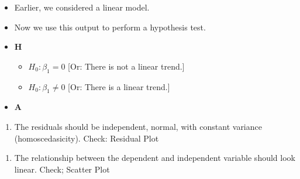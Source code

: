 \documentclass[]{article}
\newenvironment{Shaded}{\begin{snugshade}}{\end{snugshade}}
\newcommand{\DataTypeTok}[1]{\textcolor[rgb]{0.13,0.29,0.53}{#1}}
\newcommand{\DecValTok}[1]{\textcolor[rgb]{0.00,0.00,0.81}{#1}}
\newcommand{\KeywordTok}[1]{\textcolor[rgb]{0.13,0.29,0.53}{\textbf{#1}}}
\newcommand{\NormalTok}[1]{#1}
\newcommand{\OperatorTok}[1]{\textcolor[rgb]{0.81,0.36,0.00}{\textbf{#1}}}
\newcommand{\StringTok}[1]{\textcolor[rgb]{0.31,0.60,0.02}{#1}}
\providecommand{\tightlist}{%
  \setlength{\itemsep}{0pt}\setlength{\parskip}{0pt}}
\begin{document}
\begin{itemize}
\tightlist
\item
  Earlier, we considered a linear model.
\end{itemize}

\begin{Shaded}
\end{Shaded}

\begin{itemize}
\item
  Now we use this output to perform a hypothesis test.
\item
  \textbf{H}

  \begin{itemize}
  \tightlist
  \item
    \(H_0: \beta_1=0\) {[}Or: There is not a linear trend.{]}
  \item
    \(H_0: \beta_1 \neq 0\) {[}Or: There is a linear trend.{]}
  \end{itemize}
\item
  \textbf{A}
\end{itemize}

\begin{enumerate}
\def\labelenumi{(\arabic{enumi})}
\tightlist
\item
  The residuals should be independent, normal, with constant variance (homoscedasicity). Check: Residual Plot
\end{enumerate}

\begin{Shaded}
\end{Shaded}

\begin{enumerate}
\def\labelenumi{(\arabic{enumi})}
\setcounter{enumi}{1}
\tightlist
\item
  The relationship between the dependent and independent variable should look linear. Check; Scatter Plot
\end{enumerate}
\end{document}
